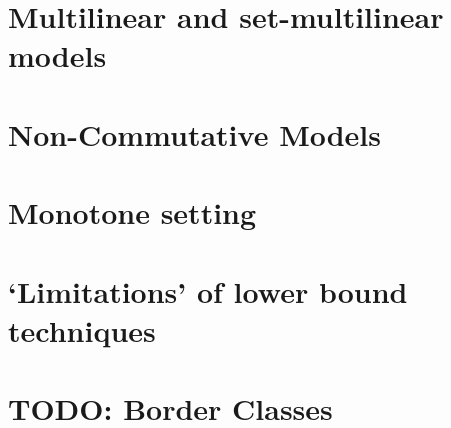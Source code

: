 








\part{Multilinear and set-multilinear models}











\part{Non-Commutative Models}






\part{Monotone setting}





\part{`Limitations' of lower bound techniques}





\part{TODO: Border Classes}


